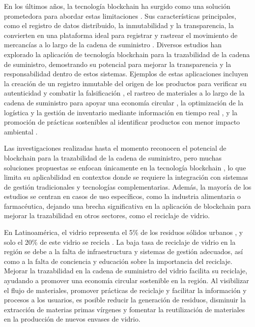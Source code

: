 En los últimos años, la tecnología blockchain ha surgido como una solución prometedora para abordar estas limitaciones \cite{baralla2023waste, bulkowska2023implementation, alnuaimi2023blockchain}. Sus características principales, como el registro de datos distribuido, la inmutabilidad y la transparencia, la convierten en una plataforma ideal para registrar y rastrear el movimiento de mercancías a lo largo de la cadena de suministro \cite{baralla2023waste}. Diversos estudios han explorado la aplicación de tecnología blockchain para la trazabilidad de la cadena de suministro, demostrando su potencial para mejorar la transparencia y la responsabilidad dentro de estos sistemas. Ejemplos de estas aplicaciones incluyen la creación de un registro inmutable del origen de los productos para verificar su autenticidad y combatir la falsificación \cite{bulkowska2023implementation}, el rastreo de materiales a lo largo de la cadena de suministro para apoyar una economía circular \cite{baralla2023waste}, la optimización de la logística y la gestión de inventario mediante información en tiempo real \cite{signeblock2024}, y la promoción de prácticas sostenibles al identificar productos con menor impacto ambiental \cite{bulkowska2023implementation}.

Las investigaciones realizadas hasta el momento reconocen el potencial de blockchain para la trazabilidad de la cadena de suministro, pero muchas soluciones propuestas se enfocan únicamente en la tecnología blockchain \cite{baralla2023waste, bulkowska2023implementation, alnuaimi2023blockchain}, lo que limita su aplicabilidad en contextos donde se requiere la integración con sistemas de gestión tradicionales y tecnologías complementarias. Además, la mayoría de los estudios se centran en casos de uso específicos, como la industria alimentaria o farmacéutica, dejando una brecha significativa en la aplicación de blockchain para mejorar la trazabilidad en otros sectores, como el reciclaje de vidrio.

En Latinoamérica, el vidrio representa el 5\% de los residuos sólidos urbanos \cite{cepal2021economia}, y solo el 20\% de este vidrio se recicla \cite{verallia2022whitebook}. La baja tasa de reciclaje de vidrio en la región se debe a la falta de infraestructura y sistemas de gestión adecuados, así como a la falta de conciencia y educación sobre la importancia del reciclaje. Mejorar la trazabilidad en la cadena de suministro del vidrio facilita su reciclaje, ayudando a promover una economía circular sostenible en la región. Al visibilizar el flujo de materiales, promover prácticas de reciclaje y facilitar la información y procesos a los usuarios, es posible reducir la generación de residuos, disminuir la extracción de materias primas vírgenes y fomentar la reutilización de materiales en la producción de nuevos envases de vidrio.

